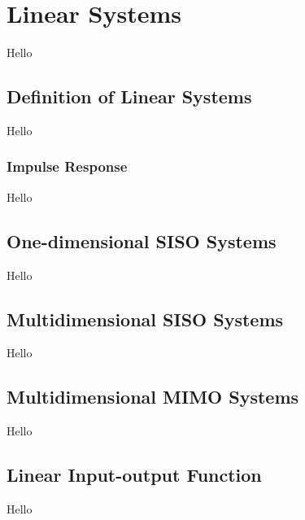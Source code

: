 \chapter{Linear Systems}
Hello

\section{Definition of Linear Systems}
Hello

\subsection{Impulse Response}
Hello

\section{One-dimensional SISO Systems}
Hello

\section{Multidimensional SISO Systems}
Hello

\section{Multidimensional MIMO Systems}
Hello

\section{Linear Input-output Function}
Hello

